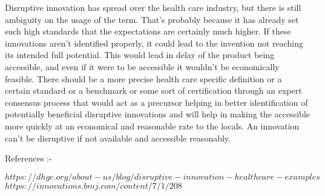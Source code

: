 \documentclass[12pt]{article}
\begin{document}
\linebreak
\linebreak
Disruptive innovation has spread over the health care industry, but there is still ambiguity on the usage of the term. That's probably because it has already set such high standards that the expectations are certainly much higher. If these innovations aren't identified properly, it could lead to the invention not reaching its intended full potential. This would lead in delay of the product being accessible, and even if it were to be accessible it wouldn't be economically feasible. There should be a more precise health care specific definition or a certain standard or a benchmark or some sort of certification through an expert consensus process that would act as a precursor helping in better identification of potentially beneficial disruptive innovations and will help in making the accessible more quickly at an economical and reasonable rate to the locals. An innovation can't be disruptive if not available and accessible reasonably.
\linebreak
\linebreak
\clearpage

\begin{Large}
References :-
\end{Large}
\linebreak
\linebreak
\begin{small}
 $https://dhge.org/about-us/blog/disruptive-innovation-healthcare-examples$
\linebreak
\linebreak
 $https://innovations.bmj.com/content/7/1/208$
\end{small}
\end{document}
